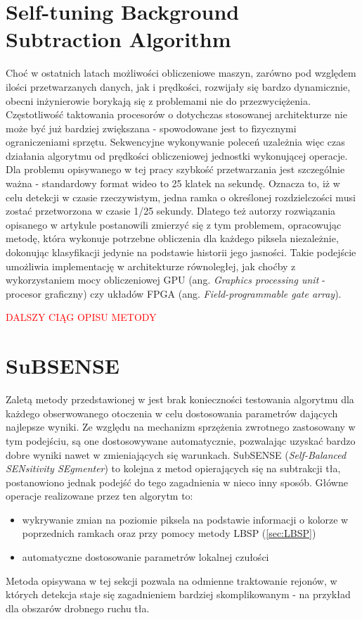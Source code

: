 \section{Self-tuning Background Subtraction Algorithm}
\label{sec:BinWang}
Choć w ostatnich latach możliwości obliczeniowe maszyn, zarówno pod względem ilości przetwarzanych danych, jak i prędkości, rozwijały się bardzo dynamicznie, obecni inżynierowie borykają się z problemami nie do przezwyciężenia. Częstotliwość taktowania procesorów o dotychczas stosowanej architekturze nie może być już bardziej zwiększana - spowodowane jest to fizycznymi ograniczeniami sprzętu. Sekwencyjne wykonywanie poleceń uzależnia więc czas działania algorytmu od prędkości obliczeniowej jednostki wykonującej operacje. Dla problemu opisywanego w tej pracy szybkość przetwarzania jest szczególnie ważna - standardowy format wideo to 25 klatek na sekundę. Oznacza to, iż w celu detekcji w czasie rzeczywistym, jedna ramka o określonej rozdzielczości musi zostać przetworzona w czasie 1/25 sekundy. Dlatego też autorzy rozwiązania opisanego w artykule \cite{6910012} postanowili zmierzyć się z tym problemem, opracowując metodę, która wykonuje potrzebne obliczenia dla każdego piksela niezależnie, dokonując klasyfikacji jedynie na podstawie historii jego jasności. Takie podejście umożliwia implementację w architekturze równoległej, jak choćby z wykorzystaniem mocy obliczeniowej GPU (ang. \textit{Graphics processing unit} - procesor graficzny) czy układów FPGA (ang. \textit{Field-programmable gate array}).\\
\begin{LARGE}
\textcolor{red}{DALSZY CIĄG OPISU METODY}
\end{LARGE}
\section{SuBSENSE}
Zaletą metody przedstawionej w \cite{stflexible} jest brak konieczności testowania algorytmu dla każdego obserwowanego otoczenia w celu dostosowania parametrów dających najlepsze wyniki. Ze względu na mechanizm sprzężenia zwrotnego zastosowany w tym podejściu, są one dostosowywane automatycznie, pozwalając uzyskać bardzo dobre wyniki nawet w zmieniających się warunkach. SubSENSE (\textit{Self-Balanced SENsitivity SEgmenter}) to kolejna z metod opierających się na subtrakcji tła, postanowiono jednak podejść do tego zagadnienia w nieco inny sposób. Główne operacje realizowane przez ten algorytm to:
\begin{itemize}
\item wykrywanie zmian na poziomie piksela na podstawie informacji o kolorze w poprzednich ramkach oraz przy pomocy metody LBSP (\ref{sec:LBSP})
\item automatyczne dostosowanie parametrów lokalnej czułości
\end{itemize}
Metoda opisywana w tej sekcji pozwala na odmienne traktowanie rejonów, w których detekcja staje się zagadnieniem bardziej skomplikowanym - na przykład dla obszarów drobnego ruchu tła. 

